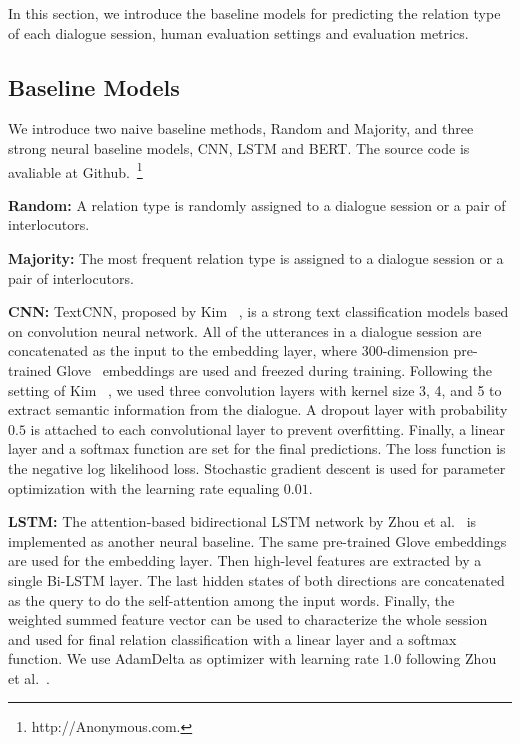 In this section, we introduce the baseline models for predicting the relation type of each dialogue session, human evaluation settings and evaluation metrics.

\subsection{Baseline Models}
We introduce two naive baseline methods, Random and Majority, and three strong neural
baseline models, CNN, LSTM and BERT. 
The source code is avaliable at Github.~\footnote{http://Anonymous.com.}

\textbf{Random:} A relation type is randomly assigned to a dialogue session or a pair of interlocutors.

\textbf{Majority:} The most frequent relation type is assigned to a dialogue session or a pair of interlocutors.

\textbf{CNN:}
TextCNN, proposed by Kim ~, is a strong text classification models 
based on convolution neural network.
All of the utterances in a dialogue session are concatenated as the input to the 
embedding layer, where 300-dimension pre-trained Glove~ 
embeddings are used and freezed 
during training. Following the setting of Kim ~, we used three convolution layers
with kernel size 3, 4, and 5 to extract semantic information from the dialogue. A dropout layer with 
probability $0.5$ is attached to each convolutional layer to prevent overfitting.
Finally, a linear layer and a softmax function are set for the final predictions. 
The loss function is the negative log likelihood loss. Stochastic gradient descent is 
used for parameter optimization with the learning rate equaling $0.01$. 

\textbf{LSTM:}
The attention-based bidirectional LSTM network by Zhou et al.~ 
is implemented as another neural baseline. The same pre-trained Glove embeddings are 
used for the embedding layer. Then high-level features are extracted by a single 
Bi-LSTM layer. The last hidden states of both directions are concatenated as the 
query to do the self-attention among the input words. Finally, the weighted summed 
feature vector can be used to characterize the whole session and used for final relation 
classification with a linear layer and a softmax function. We use AdamDelta as optimizer with
learning rate $1.0$ following Zhou et al.~.

